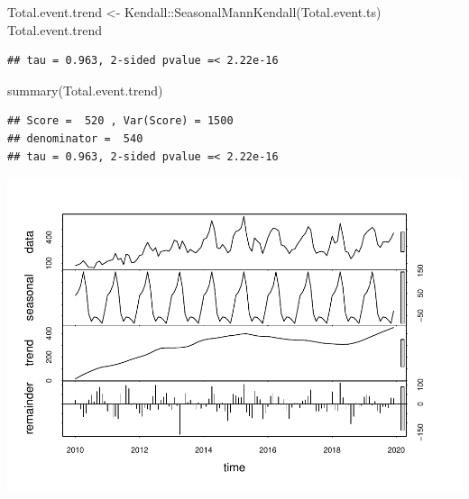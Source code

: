 \documentclass[
  12pt,
]{article}
\newenvironment{Shaded}{\begin{snugshade}}{\end{snugshade}}
\newcommand{\AttributeTok}[1]{\textcolor[rgb]{0.77,0.63,0.00}{#1}}
\newcommand{\CommentTok}[1]{\textcolor[rgb]{0.56,0.35,0.01}{\textit{#1}}}
\newcommand{\DecValTok}[1]{\textcolor[rgb]{0.00,0.00,0.81}{#1}}
\newcommand{\FunctionTok}[1]{\textcolor[rgb]{0.00,0.00,0.00}{#1}}
\newcommand{\NormalTok}[1]{#1}
\newcommand{\OtherTok}[1]{\textcolor[rgb]{0.56,0.35,0.01}{#1}}
\newcommand{\SpecialCharTok}[1]{\textcolor[rgb]{0.00,0.00,0.00}{#1}}
\newcommand{\StringTok}[1]{\textcolor[rgb]{0.31,0.60,0.02}{#1}}
\begin{document}
\begin{Shaded}
\begin{Highlighting}[]
\NormalTok{Total.event.trend }\OtherTok{\textless{}{-}}\NormalTok{ Kendall}\SpecialCharTok{::}\FunctionTok{SeasonalMannKendall}\NormalTok{(Total.event.ts) }
\NormalTok{Total.event.trend}
\end{Highlighting}
\end{Shaded}

\begin{verbatim}
## tau = 0.963, 2-sided pvalue =< 2.22e-16
\end{verbatim}

\begin{Shaded}
\begin{Highlighting}[]
\FunctionTok{summary}\NormalTok{(Total.event.trend)}
\end{Highlighting}
\end{Shaded}

\begin{verbatim}
## Score =  520 , Var(Score) = 1500
## denominator =  540
## tau = 0.963, 2-sided pvalue =< 2.22e-16
\end{verbatim}

\begin{Shaded}
\end{Shaded}

\includegraphics{Project_Template_files/figure-latex/Event TS Code-2.pdf}
\end{document}

